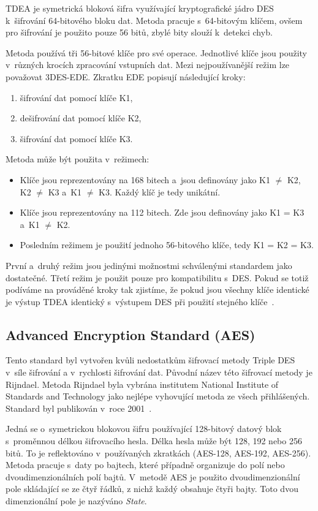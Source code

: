 TDEA je symetrická bloková šifra využívající kryptografické jádro DES k~šifrování 64-bitového bloku
dat. Metoda pracuje s~64-bitovým klíčem, ovšem pro šifrování je použito pouze 56 bitů, zbylé bity
slouží k~detekci chyb. 

Metoda používá tři 56-bitové klíče pro své operace. Jednotlivé klíče jsou použity v~různých krocích
zpracování vstupních dat. Mezi nejpoužívanější režim lze považovat 3DES-EDE. Zkratku EDE popisují
následující kroky:
\begin{enumerate}
    \item šifrování dat pomocí klíče K1,
    \item dešifrování dat pomocí klíče K2,
    \item šifrování dat pomocí klíče K3.
\end{enumerate}
Metoda může být použita v~režimech:
\begin{itemize}
    \item Klíče jsou reprezentovány na 168 bitech a~jsou definovány jako K1 $\neq$ K2, K2 $\neq$ K3
        a~K1 $\neq$ K3. Každý klíč je tedy unikátní.
    \item Klíče jsou reprezentovány na 112 bitech. Zde jsou definovány jako K1 = K3 a~K1 $\neq$ K2.
    \item Posledním režimem je použití jednoho 56-bitového klíče, tedy K1 = K2 = K3.
\end{itemize}
První a~druhý režim jsou jedinými možnostmi schválenými standardem jako dostatečné. Třetí režim
je použit pouze pro kompatibilitu s~DES. Pokud se totiž podíváme na prováděné kroky tak zjistíme,
že pokud jsou všechny klíče identické je výstup TDEA identický s~výstupem DES při použití stejného
klíče~\cite{NIST:2012}.

\subsection{Advanced Encryption Standard (AES)}
Tento standard byl vytvořen kvůli nedostatkům šifrovací metody Triple DES v~síle šifrování a
v~rychlosti šifrování dat. Původní název této šifrovací metody je Rijndael. Metoda Rijndael byla
vybrána institutem National Institute of Standards and Technology jako nejlépe vyhovující metoda ze
všech přihlášených. Standard byl publikován v~roce 2001~\cite{NIST:2001}.

Jedná se o~symetrickou blokovou šifru používající 128-bitový datový blok s~proměnnou délkou
šifrovacího hesla. Délka hesla může být 128, 192 nebo 256 bitů. To je reflektováno v~používaných
zkratkách (AES-128, AES-192, AES-256). Metoda pracuje s~daty po bajtech, které případně organizuje
do polí nebo dvoudimenzionálních polí bajtů. V~metodě AES je použito dvoudimenzionální pole
skládající se ze čtyř řádků, z nichž každý obsahuje čtyři bajty. Toto dvou dimenzionální pole je
nazýváno {\it State}.

